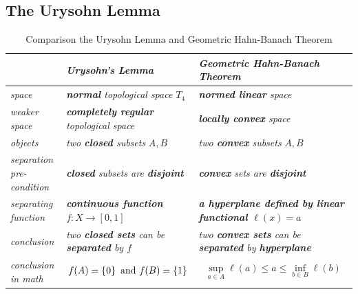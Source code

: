 \documentclass[11pt]{article}
\begin{document}
\subsection{The Urysohn Lemma}
\begin{table}[tb]
\setlength{\abovedisplayskip}{0pt}
\setlength{\belowdisplayskip}{-10pt}
\setlength{\abovedisplayshortskip}{0pt}
\setlength{\belowdisplayshortskip}{0pt}
\footnotesize
\centering
\caption{Comparison the Urysohn Lemma and Geometric Hahn-Banach Theorem}
\label{tab: separation}
\renewcommand\tabularxcolumn[1]{m{#1}}
\small
\begin{tabularx}{1\textwidth} { 
  | >{\raggedright\arraybackslash} m{2.5cm}
  | >{\centering\arraybackslash}X
  | >{\centering\arraybackslash}X  | }
 \hline
  &  \emph{Urysohn's Lemma}  & \emph{Geometric Hahn-Banach Theorem}   \\
  \hline \vspace{5pt}
\emph{space}    \vspace{2pt} & \emph{\textbf{normal} topological space $T_4$ }  & \emph{\textbf{normed linear} space} \\
\hline \vspace{5pt}
\emph{weaker space}    \vspace{2pt} & \emph{\textbf{completely regular} topological space}  & \emph{\textbf{locally convex} space} \\
 \hline \vspace{5pt}
\emph{objects}  \vspace{2pt} &  \emph{two \textbf{closed} subsets} $A, B$  & \emph{two \textbf{convex} subsets} $A, B$ \\
 \hline \vspace{5pt}
\emph{separation pre-condition}  \vspace{2pt} &  \emph{\textbf{closed} subsets are \textbf{disjoint} }  & \emph{\textbf{convex} sets are \textbf{disjoint} }   \\
 \hline \vspace{5pt}
\emph{separating function} \vspace{2pt}  &  \emph{\textbf{continuous function $f: X \rightarrow [0,1]$}}  & \emph{\textbf{a hyperplane defined by linear functional $\ell(x) = a$}}  \\
\hline \vspace{5pt}
\emph{conclusion}  \vspace{2pt}  & \emph{two \textbf{closed sets} can be \textbf{separated} by $f$} & \emph{two \textbf{convex sets} can be \textbf{separated} by \textbf{hyperplane}}
    \\
\hline \vspace{5pt}
\emph{conclusion in math} \vspace{2pt}  &  \begin{align*}
f(A) = \left\{0\right\}\text{ and }f(B) = \left\{1\right\}
\end{align*}  & \begin{align*}
\sup_{a \in A}\ell(a) \le a \le \inf_{b \in B}\ell(b)
\end{align*}   \\
\hline
\end{tabularx}
\end{table}
\end{document}

